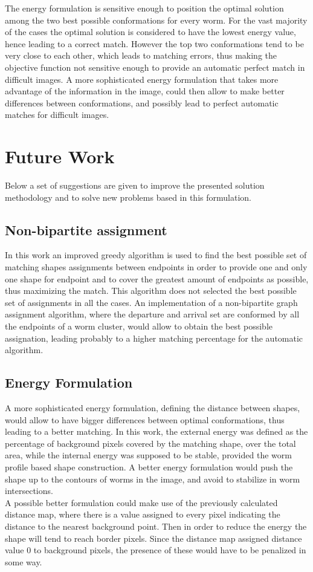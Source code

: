 The energy formulation is sensitive enough to position the optimal solution
among the two best possible conformations for every worm. For the vast majority
of the cases the optimal solution is considered to have the lowest 
energy value, hence
leading to a correct match. However the top two conformations tend to be
very close to each other, which leads to matching errors, thus making
the objective function not sensitive enough to provide an automatic perfect
match in difficult images. A more sophisticated energy formulation that
takes more advantage of the information in the image, could
then allow to make better differences between conformations, and possibly
lead to perfect automatic matches for difficult images.


\section{Future Work}

Below a set of suggestions are given to improve the presented solution
methodology and to solve new problems based in this formulation.

\subsection*{Non-bipartite assignment}
In this work an improved greedy algorithm is used to find the best
possible set of matching shapes assignments between endpoints in order
to provide one and only one shape for endpoint and to cover the greatest
amount of endpoints as possible, thus maximizing the match. This algorithm
does not selected the best possible set of assignments in all the cases. 
An implementation of a non-bipartite graph assignment algorithm, where
the departure and arrival set are conformed by all the endpoints of a worm
cluster, would allow to obtain the best possible assignation, leading
probably to a higher matching percentage for the automatic algorithm.


\subsection*{Energy Formulation}
A more sophisticated energy formulation, defining the distance between 
shapes, would allow to have bigger differences between optimal conformations,
thus leading to a better matching. In this work, the external energy was
defined as the percentage of background pixels covered by the matching shape,
over the total area, while the internal energy was supposed to be stable,
provided the worm profile based shape construction. 
A better energy formulation would push the shape up to the contours of
worms in the image, and avoid to stabilize in worm intersections.\\
A possible better formulation could make use of the previously calculated
distance map, where there is a value assigned to every pixel
indicating the distance to the nearest background point. 
Then in order to reduce the energy the shape will tend to reach border pixels.
Since the distance map assigned distance value $0$ to background pixels, the 
presence of these would have to be penalized in some way.


